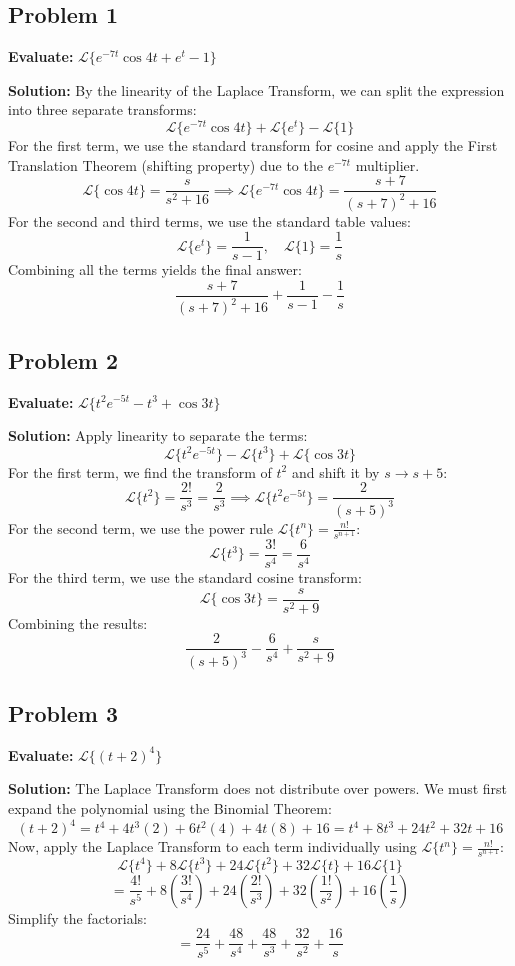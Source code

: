 \documentclass[11pt, a4paper]{article}
\theoremstyle{definition}
\theoremstyle{remark}
\begin{document}
\subsection{Problem 1}
\textbf{Evaluate:} $\mathscr{L}\{e^{-7t} \cos 4t + e^t - 1\}$

\textbf{Solution:}
By the linearity of the Laplace Transform, we can split the expression into three separate transforms:
\[
\mathscr{L}\{e^{-7t} \cos 4t\} + \mathscr{L}\{e^t\} - \mathscr{L}\{1\}
\]
For the first term, we use the standard transform for cosine and apply the First Translation Theorem (shifting property) due to the $e^{-7t}$ multiplier.
\[
\mathscr{L}\{\cos 4t\} = \frac{s}{s^2 + 16} \implies \mathscr{L}\{e^{-7t} \cos 4t\} = \frac{s+7}{(s+7)^2 + 16}
\]
For the second and third terms, we use the standard table values:
\[
\mathscr{L}\{e^t\} = \frac{1}{s-1}, \quad \mathscr{L}\{1\} = \frac{1}{s}
\]
Combining all the terms yields the final answer:
\[
\frac{s+7}{(s+7)^2 + 16} + \frac{1}{s-1} - \frac{1}{s}
\]

\subsection{Problem 2}
\textbf{Evaluate:} $\mathscr{L}\{t^2 e^{-5t} - t^3 + \cos 3t\}$

\textbf{Solution:}
Apply linearity to separate the terms:
\[
\mathscr{L}\{t^2 e^{-5t}\} - \mathscr{L}\{t^3\} + \mathscr{L}\{\cos 3t\}
\]
For the first term, we find the transform of $t^2$ and shift it by $s \to s+5$:
\[
\mathscr{L}\{t^2\} = \frac{2!}{s^3} = \frac{2}{s^3} \implies \mathscr{L}\{t^2 e^{-5t}\} = \frac{2}{(s+5)^3}
\]
For the second term, we use the power rule $\mathscr{L}\{t^n\} = \frac{n!}{s^{n+1}}$:
\[
\mathscr{L}\{t^3\} = \frac{3!}{s^4} = \frac{6}{s^4}
\]
For the third term, we use the standard cosine transform:
\[
\mathscr{L}\{\cos 3t\} = \frac{s}{s^2 + 9}
\]
Combining the results:
\[
\frac{2}{(s+5)^3} - \frac{6}{s^4} + \frac{s}{s^2 + 9}
\]

\subsection{Problem 3}
\textbf{Evaluate:} $\mathscr{L}\{(t+2)^4\}$

\textbf{Solution:}
The Laplace Transform does not distribute over powers. We must first expand the polynomial using the Binomial Theorem:
\[
(t+2)^4 = t^4 + 4t^3(2) + 6t^2(4) + 4t(8) + 16 = t^4 + 8t^3 + 24t^2 + 32t + 16
\]
Now, apply the Laplace Transform to each term individually using $\mathscr{L}\{t^n\} = \frac{n!}{s^{n+1}}$:
\[
\mathscr{L}\{t^4\} + 8\mathscr{L}\{t^3\} + 24\mathscr{L}\{t^2\} + 32\mathscr{L}\{t\} + 16\mathscr{L}\{1\}
\]
\[
= \frac{4!}{s^5} + 8\left(\frac{3!}{s^4}\right) + 24\left(\frac{2!}{s^3}\right) + 32\left(\frac{1!}{s^2}\right) + 16\left(\frac{1}{s}\right)
\]
Simplify the factorials:
\[
= \frac{24}{s^5} + \frac{48}{s^4} + \frac{48}{s^3} + \frac{32}{s^2} + \frac{16}{s}
\]
\end{document}
